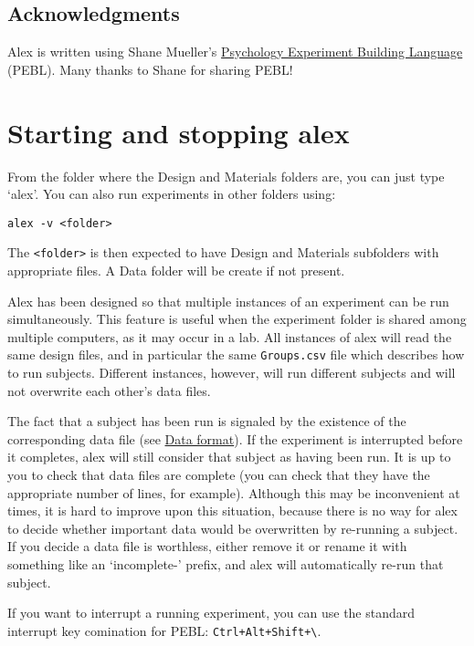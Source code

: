 \documentclass[11pt,]{article}
\begin{document}
\subsection{Acknowledgments}\label{acknowledgments}

Alex is written using Shane Mueller's
\href{http://pebl.sourceforge.net}{Psychology Experiment Building
Language} (PEBL). Many thanks to Shane for sharing PEBL!

\section{Starting and stopping alex}\label{starting-and-stopping-alex}

From the folder where the Design and Materials folders are, you can just
type `alex'. You can also run experiments in other folders using:

\begin{verbatim}
alex -v <folder>
\end{verbatim}

The \texttt{\textless{}folder\textgreater{}} is then expected to have
Design and Materials subfolders with appropriate files. A Data folder
will be create if not present.

Alex has been designed so that multiple instances of an experiment can
be run simultaneously. This feature is useful when the experiment folder
is shared among multiple computers, as it may occur in a lab. All
instances of alex will read the same design files, and in particular the
same \texttt{Groups.csv} file which describes how to run subjects.
Different instances, however, will run different subjects and will not
overwrite each other's data files.

The fact that a subject has been run is signaled by the existence of the
corresponding data file (see \hyperref[data-format]{Data format}). If
the experiment is interrupted before it completes, alex will still
consider that subject as having been run. It is up to you to check that
data files are complete (you can check that they have the appropriate
number of lines, for example). Although this may be inconvenient at
times, it is hard to improve upon this situation, because there is no
way for alex to decide whether important data would be overwritten by
re-running a subject. If you decide a data file is worthless, either
remove it or rename it with something like an `incomplete-' prefix, and
alex will automatically re-run that subject.

If you want to interrupt a running experiment, you can use the standard
interrupt key comination for PEBL:
\texttt{Ctrl+Alt+Shift+\textbackslash{}}.
\end{document}
